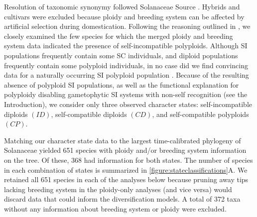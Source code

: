 Resolution of taxonomic synonymy followed Solanaceae Source \citep{solsource}. 
Hybrids and cultivars were excluded because ploidy and breeding system can be affected by artificial selection during domestication.
Following the reasoning outlined in \citet{robertson_2011}, we closely examined the few species for which the merged ploidy and breeding system data indicated the presence of self-incompatible polyploids.
Although SI populations frequently contain some SC individuals, and diploid populations frequently contain some polyploid individuals, in no case did we find convincing data for a naturally occurring SI polyploid population  \citep[discussed in][]{robertson_2011}.
Because of the resulting absence of polyploid SI populations, as well as the functional explanation for polyploidy disabling gametophytic SI systems with non-self recognition (see the Introduction), we consider only three observed character states: self-incompatible diploids $(ID)$, self-compatible diploids $(CD)$, and self-compatible polyploids $(CP)$.

Matching our character state data to the largest time-calibrated phylogeny of Solanaceae \citep{sarkinen_2013} yielded 651 species with ploidy and/or breeding system information on the tree.
Of these, 368 had information for both states.
The number of species in each combination of states is summarized in \cref{figure:stateclassifications}A.
We retained all 651 species in each of the analyses below because pruning away tips lacking breeding system in the ploidy-only analyses (and vice versa) would discard data that could inform the diversification models.
A total of 372 taxa without any information about breeding system or ploidy were excluded.

